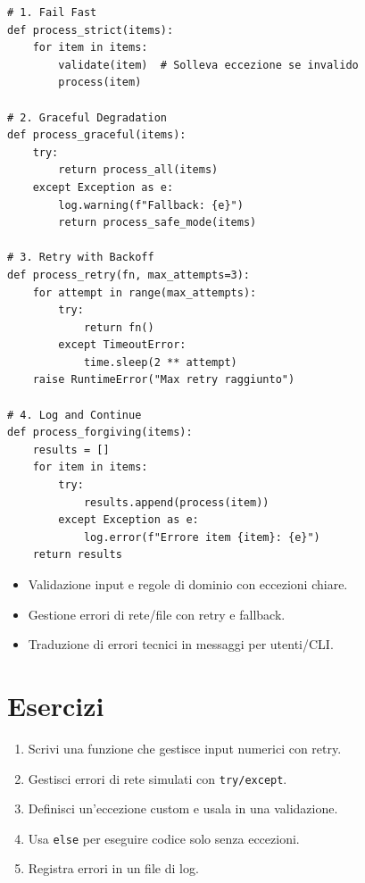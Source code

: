 
\vspace{0.5cm}
\begin{tcolorbox}[title=Esempio Comparativo delle Strategie]
\begin{lstlisting}
# 1. Fail Fast
def process_strict(items):
    for item in items:
        validate(item)  # Solleva eccezione se invalido
        process(item)

# 2. Graceful Degradation
def process_graceful(items):
    try:
        return process_all(items)
    except Exception as e:
        log.warning(f"Fallback: {e}")
        return process_safe_mode(items)

# 3. Retry with Backoff
def process_retry(fn, max_attempts=3):
    for attempt in range(max_attempts):
        try:
            return fn()
        except TimeoutError:
            time.sleep(2 ** attempt)
    raise RuntimeError("Max retry raggiunto")

# 4. Log and Continue
def process_forgiving(items):
    results = []
    for item in items:
        try:
            results.append(process(item))
        except Exception as e:
            log.error(f"Errore item {item}: {e}")
    return results
\end{lstlisting}
\end{tcolorbox}

\begin{tcolorbox}[title=Casi d'uso]
\begin{itemize}
  \item Validazione input e regole di dominio con eccezioni chiare.
  \item Gestione errori di rete/file con retry e fallback.
  \item Traduzione di errori tecnici in messaggi per utenti/CLI.
\end{itemize}
\end{tcolorbox}

\section{Esercizi}
\begin{enumerate}
  \item Scrivi una funzione che gestisce input numerici con retry.
  \item Gestisci errori di rete simulati con \texttt{try/except}.
  \item Definisci un'eccezione custom e usala in una validazione.
  \item Usa \texttt{else} per eseguire codice solo senza eccezioni.
  \item Registra errori in un file di log.
\end{enumerate}

